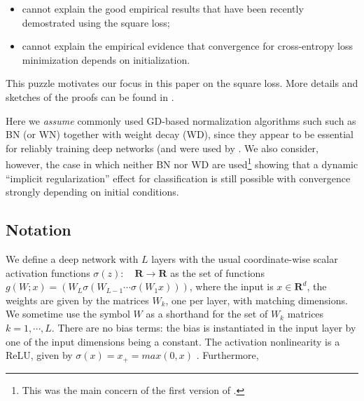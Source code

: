 \documentclass[11pt]{article}
\begin{document}
\begin{itemize}
\item cannot explain the good
empirical results that have been recently demostrated using the square loss\cite{hui2020evaluation};
\item cannot explain the empirical evidence that convergence for cross-entropy loss
  minimization depends on initialization.
\end{itemize}

This puzzle motivates our focus in this paper on the square loss.
More details and sketches of the proofs can be found in
\cite{PoggioLiaoArxiv2020}.

Here we {\it assume} commonly used GD-based normalization algorithms
such such as BN\cite{ioffe2015batch} (or WN\cite{SalDied16}) together
with weight decay (WD), since they appear to be essential for
reliably\cite{DBLP:journals/corr/abs-1812-03981} training deep
networks (and were used by \cite{hui2020evaluation}. We also consider,
however, the case in which neither BN nor WD are used\footnote{This
  was the main concern of the first version of
  \cite{PoggioLiaoArxiv2020}.} showing that a dynamic ``implicit
regularization'' effect for classification is still possible with convergence strongly
depending on initial conditions.


\subsection{Notation}

        
We define a deep network with $L$ layers with the usual
coordinate-wise scalar activation functions
$\sigma(z):\quad \mathbf{R} \to \mathbf{R}$ as the set of functions
$g(W;x) = (W_L \sigma (W_{L-1} \cdots \sigma (W_1 x)))$, where the
input is $x \in \mathbf{R}^d$, the weights are given by the matrices
$W_k$, one per layer, with matching dimensions. We sometime use the
symbol $W$ as a shorthand for the set of $W_k$ matrices
$k=1,\cdots,L$. There are no bias terms: the bias is instantiated in
the input layer by one of the input dimensions being a constant.  The
activation nonlinearity is a ReLU, given by
$\sigma (x) = x_+ = max(0, x)$ . Furthermore,
\end{document}
